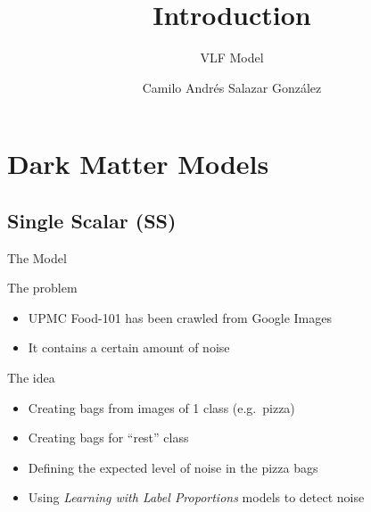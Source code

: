 \documentclass[compress,xcolor=table]{beamer}
\title{Introduction}
\subtitle{VLF Model} %
\date{\formatdate{22}{03}{2020}}
\author{Camilo Andrés Salazar González}
\institute{Physics Institute} %
\begin{document}
\begin{frame}[plain]
	\titlepage
	\setcounter{framenumber}{0}
\end{frame}


\section{Dark Matter Models} 
\subsection{Single Scalar (SS)}

\begin{frame}{The Model}
	
	\begin{alertblock}{The problem}
		
		\begin{itemize}
			\item
			UPMC Food-101 has been crawled from Google Images
			\item
			It contains a certain amount of noise
		\end{itemize}
		
	\end{alertblock}
	
	\begin{block}{The idea}
		
		\begin{itemize}
			\item
			Creating bags from images of 1 class (e.g.~pizza)
			\item
			Creating bags for ``rest'' class
			\item
			Defining the expected level of noise in the pizza bags
			\item
			Using \emph{Learning with Label Proportions} models to detect noise
		\end{itemize}
		
	\end{block}
	
\end{frame}
\end{document}
